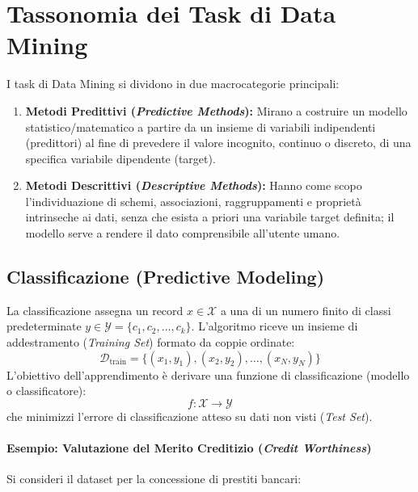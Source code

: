 \FloatBarrier
\section{Tassonomia dei Task di Data Mining}

I task di Data Mining si dividono in due macrocategorie principali:
\begin{enumerate}
    \item \textbf{Metodi Predittivi (\textit{Predictive Methods}):} Mirano a costruire un modello statistico/matematico a partire da un insieme di variabili indipendenti (predittori) al fine di prevedere il valore incognito, continuo o discreto, di una specifica variabile dipendente (target).
    \item \textbf{Metodi Descrittivi (\textit{Descriptive Methods}):} Hanno come scopo l'individuazione di schemi, associazioni, raggruppamenti e propriet\`a intrinseche ai dati, senza che esista a priori una variabile target definita; il modello serve a rendere il dato comprensibile all'utente umano.
\end{enumerate}

\subsection{Classificazione (Predictive Modeling)}
La classificazione assegna un record $x \in \mathcal{X}$ a una di un numero finito di classi predeterminate $y \in \mathcal{Y} = \{c_1, c_2, \dots, c_k\}$. L'algoritmo riceve un insieme di addestramento (\textit{Training Set}) formato da coppie ordinate:
\begin{equation}
    \mathcal{D}_{\text{train}} = \{(x_1, y_1), (x_2, y_2), \dots, (x_N, y_N)\}
\end{equation}
L'obiettivo dell'apprendimento \`e derivare una funzione di classificazione (modello o classificatore):
\begin{equation}
    f: \mathcal{X} \to \mathcal{Y}
\end{equation}
che minimizzi l'errore di classificazione atteso su dati non visti (\textit{Test Set}).

\paragraph{Esempio: Valutazione del Merito Creditizio (\textit{Credit Worthiness})}
Si consideri il dataset per la concessione di prestiti bancari:

